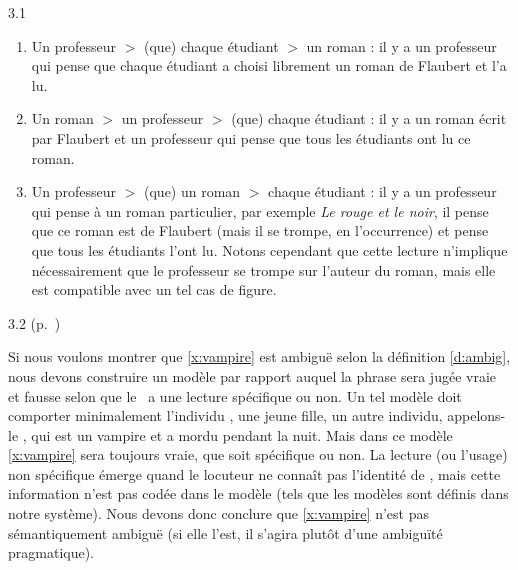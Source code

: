 \begin{Solution}{3.{1}}
\begin{enumerate}
\begin{enumerate}
\item Un professeur $>$ (que) chaque étudiant $>$ un roman :
il y a un professeur qui pense que chaque étudiant a choisi librement un roman de Flaubert et l'a lu.

\item Un roman $>$ un professeur $>$ (que) chaque étudiant :
il y a un roman écrit par Flaubert et un professeur qui pense que tous les étudiants ont lu ce roman.

\item Un professeur $>$ (que) un roman $>$ chaque étudiant :
il y a un professeur qui pense à un roman particulier, par exemple \emph{Le rouge et le noir}, il pense que ce roman est de Flaubert (mais il se trompe, en l'occurrence) et pense que tous les étudiants l'ont lu.
Notons cependant que cette lecture n'implique nécessairement que le professeur se trompe sur l'auteur du roman, mais elle est compatible avec un tel cas de figure.

\end{enumerate}

\end{enumerate}
\end{Solution}
\begin{Solution}{3.{2}}
(p.~\pageref{exo:speci})\label{crg:speci}

Si nous voulons montrer que \ref{x:vampire} est ambiguë selon la définition \ref{d:ambig}, nous devons construire un modèle par rapport auquel la phrase sera jugée vraie et fausse selon que le \GN\ a une lecture spécifique ou non.
Un tel modèle doit comporter minimalement l'individu , une jeune fille,  un autre individu, appelons-le , qui est un vampire et  a mordu  pendant la nuit.  Mais dans ce modèle \ref{x:vampire} sera toujours vraie, que  soit spécifique ou non.  La lecture (ou l'usage) non spécifique émerge quand le locuteur ne connaît pas l'identité de , mais cette information n'est pas codée dans le modèle (tels que les modèles sont définis dans notre système).  Nous devons donc conclure que \ref{x:vampire} n'est pas sémantiquement ambiguë (si elle l'est, il s'agira plutôt d'une ambiguïté pragmatique).
\end{Solution}
